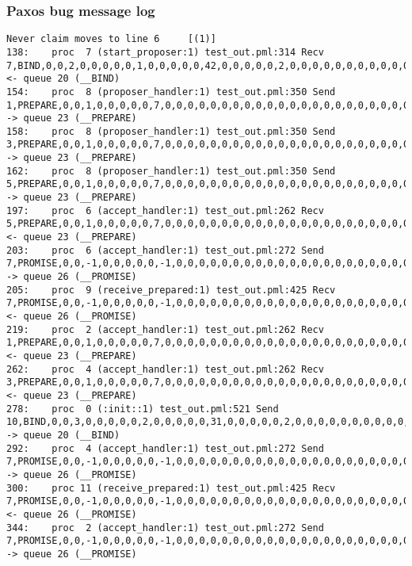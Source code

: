 \subsubsection{Paxos bug message log}
\begin{lstlisting}[xleftmargin=.01\linewidth, xrightmargin=0.01\linewidth, caption={Message passing caused by the proposer's protocol bug.}, label={lst:paxos_bug}]
    Never claim moves to line 6     [(1)]
138:    proc  7 (start_proposer:1) test_out.pml:314 Recv 7,BIND,0,0,2,0,0,0,0,0,1,0,0,0,0,0,42,0,0,0,0,0,2,0,0,0,0,0,0,0,0,0,0,0,0,0,0,0        <- queue 20 (__BIND)
154:    proc  8 (proposer_handler:1) test_out.pml:350 Send 1,PREPARE,0,0,1,0,0,0,0,0,7,0,0,0,0,0,0,0,0,0,0,0,0,0,0,0,0,0,0,0,0,0,0,0,0,0,0,0    -> queue 23 (__PREPARE)
158:    proc  8 (proposer_handler:1) test_out.pml:350 Send 3,PREPARE,0,0,1,0,0,0,0,0,7,0,0,0,0,0,0,0,0,0,0,0,0,0,0,0,0,0,0,0,0,0,0,0,0,0,0,0    -> queue 23 (__PREPARE)
162:    proc  8 (proposer_handler:1) test_out.pml:350 Send 5,PREPARE,0,0,1,0,0,0,0,0,7,0,0,0,0,0,0,0,0,0,0,0,0,0,0,0,0,0,0,0,0,0,0,0,0,0,0,0    -> queue 23 (__PREPARE)
197:    proc  6 (accept_handler:1) test_out.pml:262 Recv 5,PREPARE,0,0,1,0,0,0,0,0,7,0,0,0,0,0,0,0,0,0,0,0,0,0,0,0,0,0,0,0,0,0,0,0,0,0,0,0      <- queue 23 (__PREPARE)
203:    proc  6 (accept_handler:1) test_out.pml:272 Send 7,PROMISE,0,0,-1,0,0,0,0,0,-1,0,0,0,0,0,0,0,0,0,0,0,0,0,0,0,0,0,0,0,0,0,0,0,0,0,0,0    -> queue 26 (__PROMISE)
205:    proc  9 (receive_prepared:1) test_out.pml:425 Recv 7,PROMISE,0,0,-1,0,0,0,0,0,-1,0,0,0,0,0,0,0,0,0,0,0,0,0,0,0,0,0,0,0,0,0,0,0,0,0,0,0  <- queue 26 (__PROMISE)
219:    proc  2 (accept_handler:1) test_out.pml:262 Recv 1,PREPARE,0,0,1,0,0,0,0,0,7,0,0,0,0,0,0,0,0,0,0,0,0,0,0,0,0,0,0,0,0,0,0,0,0,0,0,0      <- queue 23 (__PREPARE)
262:    proc  4 (accept_handler:1) test_out.pml:262 Recv 3,PREPARE,0,0,1,0,0,0,0,0,7,0,0,0,0,0,0,0,0,0,0,0,0,0,0,0,0,0,0,0,0,0,0,0,0,0,0,0      <- queue 23 (__PREPARE)
278:    proc  0 (:init::1) test_out.pml:521 Send 10,BIND,0,0,3,0,0,0,0,0,2,0,0,0,0,0,31,0,0,0,0,0,2,0,0,0,0,0,0,0,0,0,0,0,0,0,0,0       -> queue 20 (__BIND)
292:    proc  4 (accept_handler:1) test_out.pml:272 Send 7,PROMISE,0,0,-1,0,0,0,0,0,-1,0,0,0,0,0,0,0,0,0,0,0,0,0,0,0,0,0,0,0,0,0,0,0,0,0,0,0    -> queue 26 (__PROMISE)
300:    proc 11 (receive_prepared:1) test_out.pml:425 Recv 7,PROMISE,0,0,-1,0,0,0,0,0,-1,0,0,0,0,0,0,0,0,0,0,0,0,0,0,0,0,0,0,0,0,0,0,0,0,0,0,0  <- queue 26 (__PROMISE)
344:    proc  2 (accept_handler:1) test_out.pml:272 Send 7,PROMISE,0,0,-1,0,0,0,0,0,-1,0,0,0,0,0,0,0,0,0,0,0,0,0,0,0,0,0,0,0,0,0,0,0,0,0,0,0    -> queue 26 (__PROMISE)

\end{lstlisting}

